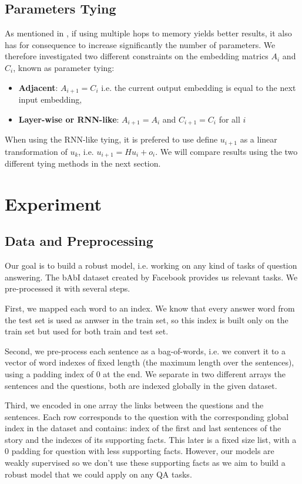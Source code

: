 \documentclass[twoside,11pt]{article}
\begin{document}
\subsection{Parameters Tying}
As mentioned in \cite{mem}, if using multiple hops to memory yields better results, it also has for consequence to increase significantly the number of parameters. We therefore investigated two different constraints on the embedding matrics $A_i$ and $C_i$, known as parameter tying:
\begin{itemize}
\item \textbf{Adjacent}: $A_{i+1} = C_i$ i.e. the current output embedding is equal to the next input embedding,
\item \textbf{Layer-wise or RNN-like}:  $A_{i+1} = A_i$ and  $C_{i+1} = C_i$ for all $i$
\end{itemize}
When using the RNN-like tying, it is prefered to use define $u_{i+1}$ as a linear transformation of $u_k$, i.e. $u_{i+1} = H u_{i} + o_{i}$. We will compare results using the two different tying methods in the next section.

\section{Experiment}
\subsection{Data and Preprocessing}

Our goal is to build a robust model, i.e. working on any kind of tasks of question answering. The bAbI dataset created by Facebook \cite{aiqua} provides us relevant tasks. We pre-processed it with several steps.

First, we mapped each word to an index. We know that every answer word from the test set is used as anwser in the train set, so this index is built only on the train set but used for both train and test set.

Second, we pre-process each sentence as a bag-of-words, i.e. we convert it to a vector of word indexes of fixed length (the maximum length over the sentences), using a padding index of 0 at the end. We separate in two different arrays the sentences and the questions, both are indexed globally in the given dataset.

Third, we encoded in one array the links between the questions and the sentences. Each row corresponds to the question with the corresponding global index in the dataset and contains: index of the first and last sentences of the story and the indexes of its supporting facts. This later is a fixed size list, with a 0 padding for question with less supporting facts. However, our models are weakly supervised so we don't use these supporting facts as we aim to build a robust model that we could apply on any QA tasks.
\end{document}
